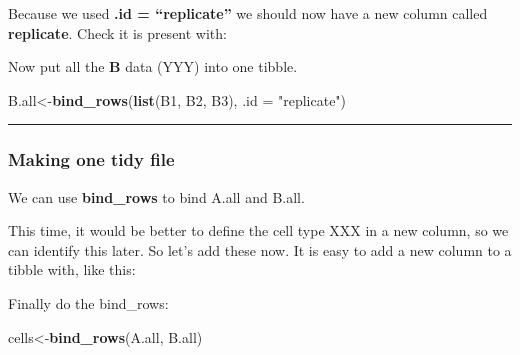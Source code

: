 \documentclass[
]{article}
\newenvironment{Shaded}{\begin{snugshade}}{\end{snugshade}}
\newcommand{\AttributeTok}[1]{\textcolor[rgb]{0.13,0.29,0.53}{#1}}
\newcommand{\FunctionTok}[1]{\textcolor[rgb]{0.13,0.29,0.53}{\textbf{#1}}}
\newcommand{\NormalTok}[1]{#1}
\newcommand{\OtherTok}[1]{\textcolor[rgb]{0.56,0.35,0.01}{#1}}
\newcommand{\SpecialCharTok}[1]{\textcolor[rgb]{0.81,0.36,0.00}{\textbf{#1}}}
\newcommand{\StringTok}[1]{\textcolor[rgb]{0.31,0.60,0.02}{#1}}
\begin{document}
Because we used \textbf{.id = ``replicate''} we should now have a new
column called \textbf{replicate}. Check it is present with:

\begin{Shaded}
\end{Shaded}

Now put all the \textbf{B} data (YYY) into one tibble.

\begin{Shaded}
\begin{Highlighting}[]
\NormalTok{B.all}\OtherTok{\textless{}{-}}\FunctionTok{bind\_rows}\NormalTok{(}\FunctionTok{list}\NormalTok{(B1, B2, B3), }\AttributeTok{.id =} \StringTok{"replicate"}\NormalTok{)}
\end{Highlighting}
\end{Shaded}

\begin{center}\rule{0.5\linewidth}{0.5pt}\end{center}

\hypertarget{making-one-tidy-file}{%
\subsubsection{Making one tidy file}\label{making-one-tidy-file}}

We can use \textbf{bind\_rows} to bind A.all and B.all.

This time, it would be better to define the cell type XXX in a new
column, so we can identify this later. So let's add these now. It is
easy to add a new column to a tibble with, like this:

\begin{Shaded}
\end{Shaded}

Finally do the bind\_rows:

\begin{Shaded}
\begin{Highlighting}[]
\NormalTok{cells}\OtherTok{\textless{}{-}}\FunctionTok{bind\_rows}\NormalTok{(A.all, B.all)}
\end{Highlighting}
\end{Shaded}
\end{document}
